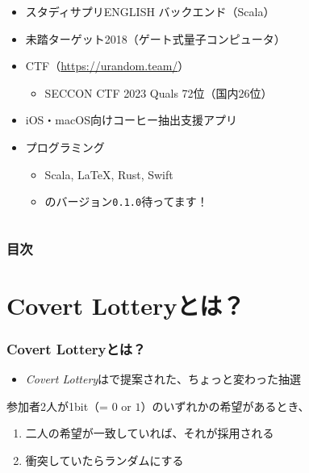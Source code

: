 \begin{frame}
\begin{columns}
\begin{column}{0.7\textwidth}
\begin{itemize}
        \item スタディサプリENGLISH バックエンド（Scala）

        \item 未踏ターゲット2018（ゲート式量子コンピュータ）

        \item CTF（\url{https://urandom.team/}）
        \begin{itemize}
          \item SECCON CTF 2023 Quals 72位（国内26位）
        \end{itemize}

        \item iOS・macOS向けコーヒー抽出支援アプリ

        \item プログラミング
        \begin{itemize}
          \item Scala, \LaTeX, Rust, Swift
          \item \SATySFi のバージョン\texttt{0.1.0}待ってます！
        \end{itemize}
      \end{itemize}
    \end{column}
  \end{columns}
\end{frame}

\begin{frame}
  \frametitle{目次}

  \tableofcontents
\end{frame}

\section{Covert Lotteryとは？}

\begin{frame}
  \frametitle{Covert Lotteryとは？}

  \begin{itemize}
    \item \emph{Covert Lottery}は\cite{covert_lottery_2021}で提案された、ちょっと変わった抽選
  \end{itemize}

  \pause
  \begin{shadequote}[r]{}
    参加者2人が1bit（= $0$ or $1$）のいずれかの希望があるとき、
    \begin{enumerate}
      \item 二人の希望が一致していれば、それが採用される
      \item 衝突していたらランダムにする
    \end{enumerate}
  \end{shadequote}

  \pause
\end{frame}

